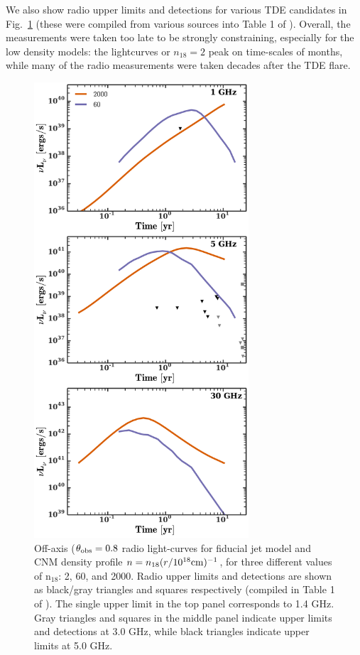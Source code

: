 \documentclass[usenatbib,fleqn]{mnras}
\begin{document}
We also show radio upper limits and detections for various TDE
candidates in Fig.~\ref{fig:upper_limits} (these were compiled from
various sources into Table 1 of \citealt{Mimica+2015}). Overall, the
measurements were taken too late to be strongly constraining,
especially for the low density models: the lightcurves or $n_{18}=2$
peak on time-scales of months, while many of the radio measurements
were taken decades after the TDE flare.

\begin{figure} 
  \includegraphics[width=8cm]{lightcurves.pdf}
  \caption{\label{fig:upper_limits} Off-axis ($\theta_{\rm obs}=0.8$
    radio light-curves for fiducial jet model and CNM density profile
    $n=n_{18} (r/10^{18} {\rm cm})^{-1}$, for three different values
    of n$_{18}$: 2, 60, and 2000. Radio upper limits and detections
    are shown as black/gray triangles and squares respectively
    (compiled in Table 1 of \citealt{Mimica+2015}). The single upper
    limit in the top panel corresponds to 1.4 GHz. Gray triangles and
    squares in the middle panel indicate upper limits and detections
    at 3.0 GHz, while black triangles indicate upper limits at 5.0
    GHz.}
\end{figure}
\end{document}
